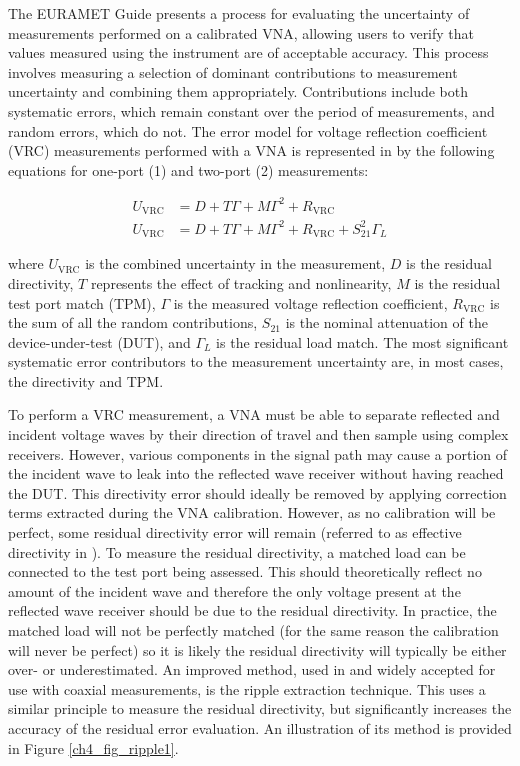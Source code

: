 \documentclass[../thesis/thesis.tex]{subfiles}
\begin{document}
\begin{refsection}
The EURAMET Guide \cite{EURAMET_2011} presents a process for evaluating the uncertainty of measurements performed on a calibrated VNA, allowing users to verify that values measured using the instrument are of acceptable accuracy. This process involves measuring a selection of dominant contributions to measurement uncertainty and combining them appropriately. Contributions include both systematic errors, which remain constant over the period of measurements, and random errors, which do not.  The error model for voltage reflection coefficient (VRC) measurements performed with a VNA is represented in \cite{EURAMET_2011} by the following equations for one-port (1) and two-port (2) measurements:

\begin{align}
U_{\textrm{VRC}} &= D + T\Gamma + M\Gamma^2 + R_{\textrm{VRC}}\\
U_{\textrm{VRC}} &= D + T\Gamma + M\Gamma^2 + R_{\textrm{VRC}} + S_{21}^2\Gamma_L
\end{align}

where $U_{\textrm{VRC}}$ is the combined uncertainty in the measurement, $D$ is the residual directivity, $T$ represents the effect of tracking and nonlinearity, $M$ is the residual test port match (TPM), $\Gamma$ is the measured voltage reflection coefficient, $R_{\textrm{VRC}}$ is the sum of all the random contributions, $S_{21}$ is the nominal attenuation of the device-under-test (DUT), and $\Gamma_L$ is the residual load match. The most significant systematic error contributors to the measurement uncertainty are, in most cases, the directivity and TPM.

To perform a VRC measurement, a VNA must be able to separate reflected and incident voltage waves by their direction of travel and then sample using complex receivers. However, various components in the signal path may cause a portion of the incident wave to leak into the reflected wave receiver without having reached the DUT. This directivity error should ideally be removed by applying correction terms extracted during the VNA calibration. However, as no calibration will be perfect, some residual directivity error will remain (referred to as effective directivity in \cite{EURAMET_2011}). To measure the residual directivity, a matched load can be connected to the test port being assessed. This should theoretically reflect no amount of the incident wave and therefore the only voltage present at the reflected wave receiver should be due to the residual directivity. In practice, the matched load will not be perfectly matched (for the same reason the calibration will never be perfect) so it is likely the residual directivity will typically be either over- or underestimated. An improved method, used in \cite{EURAMET_2011} and widely accepted for use with coaxial measurements, is the ripple extraction technique. This uses a similar principle to measure the residual directivity, but significantly increases the accuracy of the residual error evaluation. An illustration of its method is provided in Figure \ref{ch4_fig_ripple1}.


\end{refsection}
\end{document}
